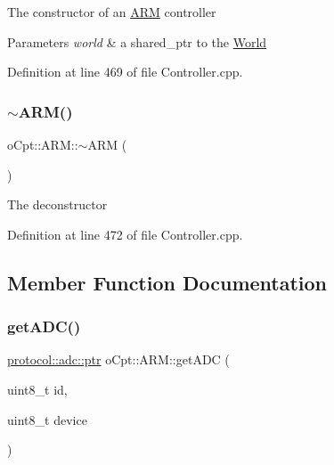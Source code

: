 The constructor of an \hyperlink{classo_cpt_1_1_a_r_m}{A\+RM} controller 
\begin{DoxyParams}{Parameters}
{\em world} & a shared\+\_\+ptr to the \hyperlink{classo_cpt_1_1_world}{World} \\
\hline
\end{DoxyParams}


Definition at line 469 of file Controller.\+cpp.

\hypertarget{classo_cpt_1_1_a_r_m_a2be59dd26648e2a21c3996bcc3b2b153}{}\label{classo_cpt_1_1_a_r_m_a2be59dd26648e2a21c3996bcc3b2b153} 
\subsubsection{\texorpdfstring{$\sim$\+A\+R\+M()}{~ARM()}}
{\footnotesize\ttfamily o\+Cpt\+::\+A\+R\+M\+::$\sim$\+A\+RM (\begin{DoxyParamCaption}{ }\end{DoxyParamCaption})\hspace{0.3cm}{\ttfamily [virtual]}}

The deconstructor 

Definition at line 472 of file Controller.\+cpp.



\subsection{Member Function Documentation}
\hypertarget{classo_cpt_1_1_a_r_m_a2f773bcd04719d81994af8930ca974bd}{}\label{classo_cpt_1_1_a_r_m_a2f773bcd04719d81994af8930ca974bd} 
\subsubsection{\texorpdfstring{get\+A\+D\+C()}{getADC()}}
{\footnotesize\ttfamily \hyperlink{classo_cpt_1_1protocol_1_1adc_a94af68cb9c573629a4a1a16f8ebd3dff}{protocol\+::adc\+::ptr} o\+Cpt\+::\+A\+R\+M\+::get\+A\+DC (\begin{DoxyParamCaption}\item[{uint8\+\_\+t}]{id,  }\item[{uint8\+\_\+t}]{device }\end{DoxyParamCaption})\hspace{0.3cm}{\ttfamily [virtual]}}

